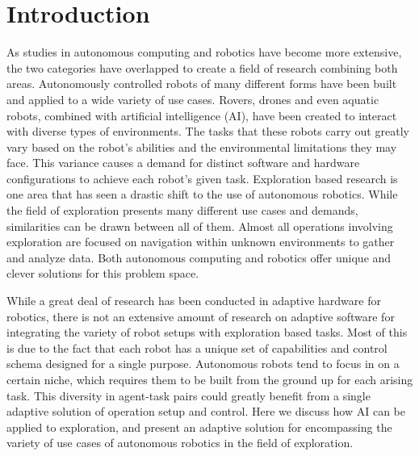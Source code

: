 

\chapter{Introduction}
As studies in autonomous computing and robotics have become more extensive, the two categories have overlapped to create a field of research combining both areas.
Autonomously controlled robots of many different forms have been built and applied to a wide variety of use cases.
Rovers, drones and even aquatic robots, combined with artificial intelligence (AI), have been created to interact with diverse types of environments.
The tasks that these robots carry out greatly vary based on the robot's abilities and the environmental limitations they may face.
This variance causes a demand for distinct software and hardware configurations to achieve each robot's given task.
Exploration based research is one area that has seen a drastic shift to the use of autonomous robotics.
While the field of exploration presents many different use cases and demands, similarities can be drawn between all of them.
Almost all operations involving exploration are focused on navigation within unknown environments to gather and analyze data.
Both autonomous computing and robotics offer unique and clever solutions for this problem space.

While a great deal of research has been conducted in adaptive hardware for robotics, there is not an extensive amount of research on adaptive software for integrating the variety of robot setups with exploration based tasks.
Most of this is due to the fact that each robot has a unique set of capabilities and control schema designed for a single purpose.
Autonomous robots tend to focus in on a certain niche, which requires them to be built from the ground up for each arising task.
This diversity in agent-task pairs could greatly benefit from a single adaptive solution of operation setup and control.
Here we discuss how AI can be applied to exploration, and present an adaptive solution for encompassing the variety of use cases of autonomous robotics in the field of exploration.


